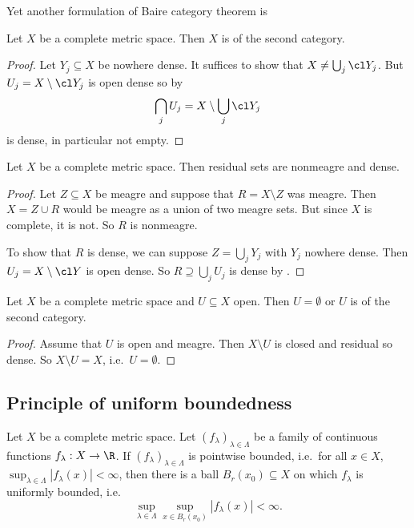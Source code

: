 \documentclass[a4paper]{article}
\begin{document}
Yet another formulation of Baire category theorem is

\begin{corollary}
  Let \(X\) be a complete metric space. Then \(X\) is of the second category.
\end{corollary}

\begin{proof}
  Let \(Y_j \subseteq X\) be nowhere dense. It suffices to show that \(X \neq \bigcup_j \cl Y_j\). But \(U_j = X \setminus \cl Y_j\) is open dense so by 
  \[
    \bigcap_j U_j = X \setminus \bigcup_j \cl Y_j
  \]
  is dense, in particular not empty.
\end{proof}

\begin{corollary}
  Let \(X\) be a complete metric space. Then residual sets are nonmeagre and dense.
\end{corollary}

\begin{proof}
  Let \(Z \subseteq X\) be meagre and suppose that \(R = X \setminus Z\) was meagre. Then \(X = Z \cup R\) would be meagre as a union of two meagre sets. But since \(X\) is complete, it is not. So \(R\) is nonmeagre.

  To show that \(R\) is dense, we can suppose \(Z = \bigcup_j Y_j\) with \(Y_j\) nowhere dense. Then \(U_j = X \setminus \cl Y\) is open dense. So \(R \supseteq \bigcup_j U_j\) is dense by .
\end{proof}

\begin{corollary}
  Let \(X\) be a complete metric space and \(U \subseteq X\) open. Then \(U = \emptyset\) or \(U\) is of the second category.
\end{corollary}

\begin{proof}
  Assume that \(U\) is open and meagre. Then \(X \setminus U\) is closed and residual so dense. So \(X \setminus U = X\), i.e.\ \(U = \emptyset\).
\end{proof}

\subsection{Principle of uniform boundedness}

\begin{theorem}
  Let \(X\) be a complete metric space. Let \((f_\lambda)_{\lambda \in \Lambda}\) be a family of continuous functions \(f_\lambda: X \to \R\). If \((f_\lambda)_{\lambda \in \Lambda}\) is pointwise bounded, i.e.\ for all \(x \in X\), \(\sup_{\lambda \in \Lambda} |f_\lambda(x)| < \infty\), then there is a ball \(B_r(x_0) \subseteq X\) on which \(f_\lambda\) is uniformly bounded, i.e.
  \[
    \sup_{\lambda \in \Lambda} \sup_{x \in B_r(x_0)} |f_\lambda(x)| < \infty.
  \]
\end{theorem}
\end{document}
